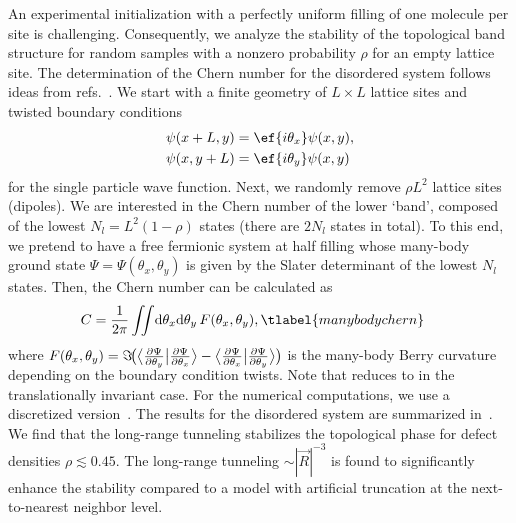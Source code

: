 An experimental initialization with a perfectly uniform filling of one molecule per site is challenging.
Consequently, we analyze the stability of the topological band structure for random samples with a nonzero probability $\rho$ for an empty lattice site.
The determination of the Chern number for the disordered system follows ideas from refs.~\cite{Niu1985,Avron1985}.
We start with a finite geometry of $L \times L$ lattice sites and twisted boundary conditions
\begin{align}
    \psi(x + L, y) &= \ef{i\theta_x}\psi(x, y), \\
    \psi(x, y + L) &= \ef{i\theta_y}\psi(x, y)
\end{align}
for the single particle wave function.
Next, we randomly remove $\rho L^2$ lattice sites (dipoles).
We are interested in the Chern number of the lower `band', composed of the lowest $N_l=L^2 (1-\rho)$ states (there are $2N_l$ states in total).
To this end, we pretend to have a free fermionic system at half filling whose many-body ground state $\Psi=\Psi(\theta_x, \theta_y)$ is given by the Slater determinant of the lowest $N_l$ states.
Then, the Chern number can be calculated as
\begin{align}
    C &= \frac{1}{2\pi}\iint\!\mathrm{d}\theta_x \mathrm{d}\theta_y \, F(\theta_x, \theta_y), \tlabel{manybodychern}
\end{align}
where $F(\theta_x,\theta_y)=\smash{\Im\!\big({\big\langle\frac{\partial \Psi}{\partial \theta_y}\big|\frac{\partial \Psi}{\partial \theta_x}\big\rangle - \big\langle\frac{\partial \Psi}{\partial \theta_x}\big|\frac{\partial \Psi}{\partial \theta_y}\big\rangle}\big)}$ is the many-body Berry curvature depending on the boundary condition twists.
Note that  reduces to  in the translationally invariant case.
For the numerical computations, we use a discretized version~\cite{Fukui2005}.
The results for the disordered system are summarized in~.
We find that the long-range tunneling stabilizes the topological phase for defect densities $\rho\lesssim 0.45$.
The long-range tunneling ${\sim}|\vec{R}|^{-3}$ is found to significantly enhance the stability compared to a model with artificial truncation at the next-to-nearest neighbor level.


\begin{figure}
{}
\end{figure}

